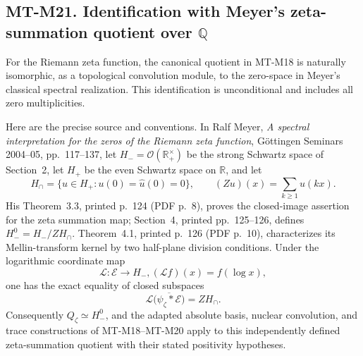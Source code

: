 \subsection*{MT-M21. Identification with Meyer's zeta-summation quotient over \(\mathbb Q\)}
For the Riemann zeta function, the canonical quotient in MT-M18
is naturally isomorphic, as a topological convolution module,
to the zero-space in Meyer's classical spectral realization.
This identification is unconditional and includes all zero
multiplicities.

Here are the precise source and conventions. In Ralf Meyer,
\emph{A spectral interpretation for the zeros of the Riemann
zeta function}, G\"ottingen Seminars 2004--05, pp.~117--137,
let \(H_- =\mathcal O(\mathbb R_+^\times)\) be the strong
Schwartz space of Section~2, let \(H_+\) be the even Schwartz
space on \(\mathbb R\), and let
\[
 H_\cap=\{u\in H_+:u(0)=\widehat u(0)=0\},\qquad
 (Zu)(x)=\sum_{k\ge1}u(kx).
\]
His Theorem~3.3, printed p.~124 (PDF p.~8), proves the
closed-image assertion for the zeta summation map; Section~4,
printed pp.~125--126, defines
\(H_-^0=H_-/ZH_\cap\).
Theorem~4.1, printed p.~126 (PDF p.~10), characterizes its
Mellin-transform kernel by two half-plane division conditions.
Under the logarithmic coordinate map
\[
       \mathcal L:\mathcal E\longrightarrow H_-,
       (\mathcal Lf)(x)=f(\log x),
\]
one has the exact equality of closed subspaces
\[
          \mathcal L\bigl(\overline{\psi_\zeta*\mathcal E}\bigr)
                         = ZH_\cap.                  \tag{M21.1}
\]
Consequently \(Q_\zeta\simeq H_-^0\), and the adapted
absolute basis, nuclear convolution, and trace constructions
of MT-M18--MT-M20 apply to this independently defined
zeta-summation quotient with their stated positivity hypotheses.

